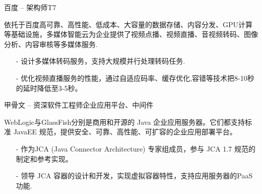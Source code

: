 \documentclass[10pt,a4paper]{moderncv}
\begin{document}
\pagebreak

	{ 百度 -- 架构师}{T7}{}{}{}
	\vspace{1ex}

{
	 依托于百度高可靠、高性能、低成本、大容量的数据存储、内容分发、GPU计算等基础设施，多媒体智能云为企业提供了视频点播、视频直播、音视频转码、图像分析、内容审核等多媒体服务.
	 \begin{itemize}
		\item[-] 设计多媒体转码服务，支持大规模并行处理转码任务.
		\item[-] 优化视频直播服务的性能，通过自适应码率、缓存优化,容错等技术把8-10秒的延时降低至3-5秒。
	 \end{itemize}
}

\vspace{2ex}
\vspace*{0.4\baselineskip}

{ 甲骨文 -- 资深软件工程师}{企业应用平台、中间件}{}{}{}
\vspace{1ex}
{
  WebLogic与GlassFish分别是商用和开源的 Java 企业应用服务器。它们都支持标准 JavaEE 规范，提供安全、可靠、高性能、可扩容的企业应用部署平台。
  \begin{itemize}
    \item[-] 作为JCA (Java Connector Architecture) 专家组成员，参与 JCA 1.7 规范的制定和参考实现。
    \item[-] 领导 JCA 容器的设计和开发，实现虚拟容器特性，支持应用服务器的PaaS功能.
  \end{itemize}
}

\vspace{2ex}
\vspace*{0.4\baselineskip}
\end{document}
